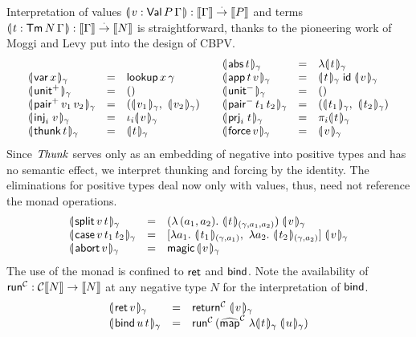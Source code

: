 \documentclass[a4paper,USenglish,cleveref, autoref]{lipics-v2019}
\begin{document}
Interpretation of values
$\denty{ v : \PValTm P \Gamma } : \den \Gamma \todot \den P$
and terms
$\denty{ t : \Tm N \Gamma } : \den \Gamma \todot \den N$
is straightforward, thanks to the pioneering work of
Moggi \cite{moggi:infcomp91} and
Levy \cite{levy:hosc06}
put into the design of CBPV.
\[
\begin{array}{lcl}
  \\
  \dent{\tvar\,x}\gamma & = & \tlookup\,x\,\gamma \\
  \dent{\punit}\gamma   & = & \ttempty \\
  \dent{\ppair\,v_1\,v_2}\gamma & = &
    (\dent{v_1}\gamma,\ \dent{v_2}\gamma) \\
  \dent{\inj i v}\gamma & = & \iota_i \dent v \gamma \\
  \dent{\tthunk\,t}\gamma & = & \dent t \gamma \\
\end{array}
\quad
\begin{array}{lcl}
  \dent{\tabs\,t}\gamma
      & = & \fdent t \gamma \\
  \dent{\tapp\,t\,v} \gamma & = &
     \dent t \gamma\;\tid\;\dent v \gamma \\
  \dent{\nunit}\gamma & = & \ttempty \\
  \dent{\npair\,t_1\,t_2}\gamma & = &
    (\dent{t_1}\gamma,\ \dent{t_2}\gamma) \\
  \dent{\prj i t}\gamma & = & \pi_i \dent t \gamma \\
  \dent{\tforce\,v}\gamma & = & \dent v \gamma \\
\end{array}
\]
Since $\tThunk$ serves only as an embedding of negative into positive
types and has no semantic effect,
we interpret thunking and forcing by the identity.
The eliminations for positive types deal now only with values, thus,
need not reference the monad operations.
\[
\begin{array}{lcl}
  \dent{\tsplit\,v\,t}\gamma & = & (\lambda\,(a_1,a_2).\
    \dent{t}{(\gamma,a_1,a_2)} ) \; \dent v \gamma \\
  \dent{\tcase\,v\,t_1\,t_2}\gamma & = &
    [  \lambda a_1.\ \dent{t_1}{(\gamma,a_1)}
    ,\ \lambda a_2.\ \dent{t_2}{(\gamma,a_2)}
    ]\; \dent v \gamma \\
  \dent{\tabort\,v}\gamma & = & \tmagic\,\dent v \gamma \\
\end{array}
\]
The use of the monad is confined to $\tret$ and $\tbind$.
Note the availability of $\trun^\C : \C \den N \to \den N$
at any negative type $N$ for the interpretation of $\tbind$.
\[
\begin{array}{lcl}
  \dent{\tret\,v}\gamma & = & \treturn[\C] \; \dent v \gamma \\
  \dent{\tbind\,u\,t}\gamma & = & \trun^\C\,
    (\stmap[\C] \; \fdent t \gamma\; \dent u \gamma) \\
\end{array}
\]
\end{document}

